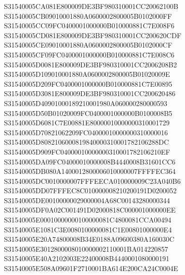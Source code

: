 \documentclass[12pt,a4paper]{article}
\begin{document}
\begin{framed}
{S31540005CA081E800009DE3BF980310001CC20062100B\newline
S31540005CB09010001880A0600002800005B0102000FF\newline
S31540005CC09FC0400001000000B010000881C7E008F6\newline
S31540005CD081E800009DE3BF980310001CC200620CDF\newline
S31540005CE09010001880A0600002800005B0102000CF\newline
S31540005CF09FC0400001000000B010000881C7E008C6\newline
S31540005D0081E800009DE3BF980310001CC2006208B2\newline
S31540005D109010001880A0600002800005B01020009E\newline
S31540005D209FC0400001000000B010000881C7E00895\newline
S31540005D3081E800009DE3BF980310001CC200620486\newline
S31540005D40901000189210001980A060000280000593\newline
S31540005D50B01020009FC0400001000000B0100008B5\newline
S31540005D6081C7E00881E80000010000000310001729\newline
S31540005D70821062209FC04000010000000310000016\newline
S31540005D8082106000819840000310001782106288DC\newline
S31540005D909FC04000010000000310001782106210EF\newline
S31540005DA09FC04000010000008B4440008B31601CC6\newline
S31540005DB080A1400012800006010000007FFFFEC364\newline
S31540005DC0010000007FFFEECA010000009C23A040B6\newline
S31540005DD07FFFEC8C010000008210200191D0200052\newline
S31540005DE00100000029000004A68C00143280000344\newline
S31540005DF0A02C001491D02000818C000001000000EE\newline
S31540005E00010000000100000081C4800081CCA00494\newline
S31540005E1081C3E0080100000081C1E00801000000E4\newline
S31540005E20A74800008B34E0188A09600380A160030C\newline
S31540005E3012800008010000002110001BA014220857\newline
S31540005E40A2102003E22400008B4440001080000191\newline
S31540005E508A09601F2710001BA614E200CA24C0004E\newline
}
\end{framed}
\end{document}
